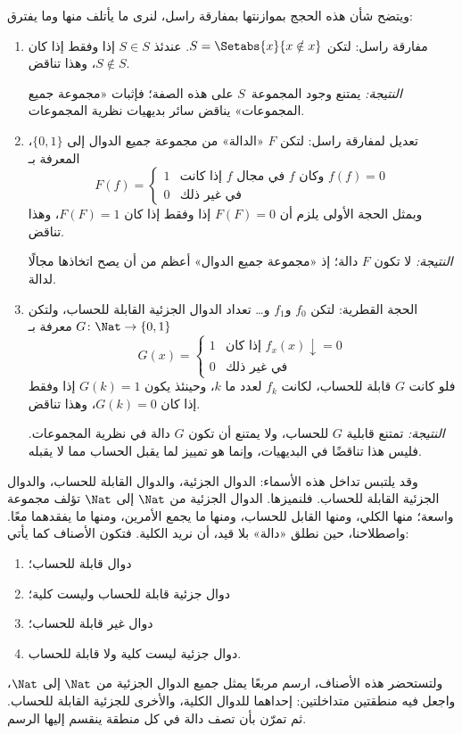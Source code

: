 \documentclass[../../../include/open-logic-section]{subfiles}
\begin{document}

ويتضح شأن هذه الحجج بموازنتها بمفارقة راسل، لنرى ما يأتلف منها وما
يفترق:
\begin{enumerate}
\item مفارقة راسل: لتكن $S=\Setabs{x}{x\notin x}$. عندئذ
$S\in S$ إذا وفقط إذا كان $S\notin S$، وهذا تناقض.

  \emph{النتيجة:} يمتنع وجود المجموعة~$S$ على هذه الصفة؛ فإثبات «مجموعة جميع
  المجموعات» يناقض سائر بديهيات نظرية المجموعات.

\item تعديل لمفارقة راسل: لتكن $F$ «الدالة» من مجموعة جميع الدوال إلى
$\{0,1\}$، المعرفة بـ
  \[
  F(f) =
  \begin{cases}
    1 & \text{إذا كانت $f$ في مجال $f$ وكان $f(f) = 0$} \\
    0 & \text{في غير ذلك}
  \end{cases}
  \]
  وبمثل الحجة الأولى يلزم أن $F(F)=0$ إذا وفقط إذا كان $F(F)=1$، وهذا تناقض.

  \emph{النتيجة:} لا تكون $F$ دالة؛ إذ «مجموعة جميع الدوال» أعظم من أن
  يصح اتخاذها مجالًا لدالة.

\item الحجة القطرية: لتكن $f_0$ و$f_1$ و… تعداد الدوال الجزئية
  القابلة للحساب، ولتكن $G\colon\Nat\to\{0,1\}$ معرفة بـ
  \[
  G(x) =
  \begin{cases}
    1 & \text{إذا كان $f_x(x)\downarrow = 0$} \\
    0 & \text{في غير ذلك}
  \end{cases}
  \]
  فلو كانت $G$ قابلة للحساب، لكانت $f_k$ لعدد ما $k$، وحينئذ
  يكون $G(k)=1$ إذا وفقط إذا كان $G(k)=0$، وهذا تناقض.

  \emph{النتيجة:} تمتنع قابلية $G$ للحساب، ولا يمتنع أن تكون $G$ دالة في
  نظرية المجموعات. فليس هذا تناقضًا في البديهيات، وإنما هو تمييز لما يقبل الحساب مما لا يقبله.
\end{enumerate}

وقد يلتبس تداخل هذه الأسماء: الدوال الجزئية، والدوال القابلة للحساب،
والدوال الجزئية القابلة للحساب. فلنميزها. الدوال
الجزئية من $\Nat$ إلى $\Nat$ تؤلف مجموعة واسعة؛ منها الكلي،
ومنها القابل للحساب، ومنها ما يجمع الأمرين، ومنها ما يفقدهما
معًا. واصطلاحنا، حين نطلق «دالة» بلا قيد، أن نريد الكلية.
فتكون الأصناف كما يأتي:
\begin{enumerate}
\item دوال قابلة للحساب؛
\item دوال جزئية قابلة للحساب وليست كلية؛
\item دوال غير قابلة للحساب؛
\item دوال جزئية ليست كلية ولا قابلة للحساب.
\end{enumerate}
ولتستحضر هذه الأصناف، ارسم مربعًا يمثل جميع الدوال الجزئية من
$\Nat$ إلى $\Nat$، واجعل فيه منطقتين متداخلتين: إحداهما للدوال الكلية،
والأخرى للجزئية القابلة للحساب. ثم تمرّن بأن
تصف دالة في كل منطقة ينقسم إليها الرسم.
\end{document}
